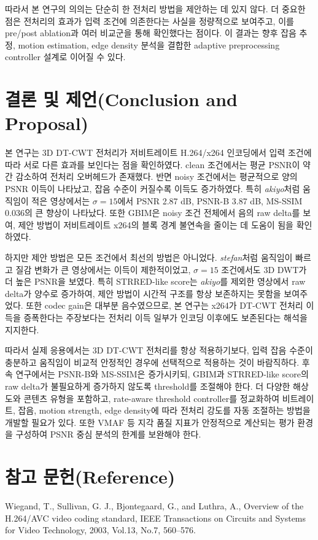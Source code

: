 \documentclass[10pt]{article}
\begin{document}
따라서 본 연구의 의의는 단순히 한 전처리 방법을 제안하는 데 있지 않다. 더 중요한 점은 전처리의 효과가 입력 조건에 의존한다는 사실을 정량적으로 보여주고, 이를 pre/post ablation과 여러 비교군을 통해 확인했다는 점이다. 이 결과는 향후 잡음 추정, motion estimation, edge density 분석을 결합한 adaptive preprocessing controller 설계로 이어질 수 있다.

\section{\large \bf 결론 및 제언(Conclusion and Proposal)}
본 연구는 3D DT-CWT 전처리가 저비트레이트 H.264/x264 인코딩에서 입력 조건에 따라 서로 다른 효과를 보인다는 점을 확인하였다. clean 조건에서는 평균 PSNR이 약간 감소하여 전처리 오버헤드가 존재했다. 반면 noisy 조건에서는 평균적으로 양의 PSNR 이득이 나타났고, 잡음 수준이 커질수록 이득도 증가하였다. 특히 \textit{akiyo}처럼 움직임이 적은 영상에서는 $\sigma=15$에서 PSNR 2.87 dB, PSNR-B 3.87 dB, MS-SSIM 0.036의 큰 향상이 나타났다. 또한 GBIM은 noisy 조건 전체에서 음의 raw delta를 보여, 제안 방법이 저비트레이트 x264의 블록 경계 불연속을 줄이는 데 도움이 됨을 확인하였다.

하지만 제안 방법은 모든 조건에서 최선의 방법은 아니었다. \textit{stefan}처럼 움직임이 빠르고 질감 변화가 큰 영상에서는 이득이 제한적이었고, $\sigma=15$ 조건에서도 3D DWT가 더 높은 PSNR을 보였다. 특히 STRRED-like score는 \textit{akiyo}를 제외한 영상에서 raw delta가 양수로 증가하여, 제안 방법이 시간적 구조를 항상 보존하지는 못함을 보여주었다. 또한 codec gain은 대부분 음수였으므로, 본 연구는 x264가 DT-CWT 전처리 이득을 증폭한다는 주장보다는 전처리 이득 일부가 인코딩 이후에도 보존된다는 해석을 지지한다.

따라서 실제 응용에서는 3D DT-CWT 전처리를 항상 적용하기보다, 입력 잡음 수준이 충분하고 움직임이 비교적 안정적인 경우에 선택적으로 적용하는 것이 바람직하다. 후속 연구에서는 PSNR-B와 MS-SSIM은 증가시키되, GBIM과 STRRED-like score의 raw delta가 불필요하게 증가하지 않도록 threshold를 조절해야 한다. 더 다양한 해상도와 콘텐츠 유형을 포함하고, rate-aware threshold controller를 정교화하여 비트레이트, 잡음, motion strength, edge density에 따라 전처리 강도를 자동 조절하는 방법을 개발할 필요가 있다. 또한 VMAF 등 지각 품질 지표가 안정적으로 계산되는 평가 환경을 구성하여 PSNR 중심 분석의 한계를 보완해야 한다.

\section{\large \bf 참고 문헌(Reference)}
\noindent[1] Wiegand, T., Sullivan, G. J., Bjontegaard, G., and Luthra, A., Overview of the H.264/AVC video coding standard, IEEE Transactions on Circuits and Systems for Video Technology, 2003, Vol.13, No.7, 560--576.
\end{document}
